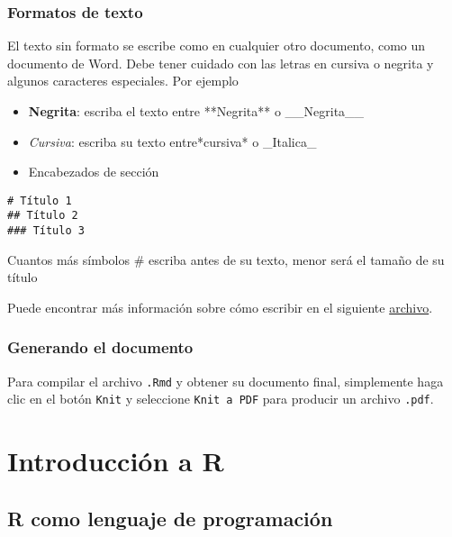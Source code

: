 \documentclass[
]{book}
\providecommand{\tightlist}{%
  \setlength{\itemsep}{0pt}\setlength{\parskip}{0pt}}
\begin{document}
\hypertarget{formatos-de-texto}{%
\subsection{Formatos de texto}\label{formatos-de-texto}}

El texto sin formato se escribe como en cualquier otro documento, como un documento de Word. Debe tener cuidado con las letras en cursiva o negrita y algunos caracteres especiales. Por ejemplo

\begin{itemize}
\tightlist
\item
  \textbf{Negrita}: escriba el texto entre **Negrita** o \_\_Negrita\_\_
\item
  \emph{Cursiva}: escriba su texto entre*cursiva* o \_Italica\_
\item
  Encabezados de sección
\end{itemize}

\begin{verbatim}
# Título 1
## Título 2
### Título 3
\end{verbatim}

Cuantos más símbolos \# escriba antes de su texto, menor será el tamaño de su título

Puede encontrar más información sobre cómo escribir en el siguiente \href{https://rstudio.com/wp-content/uploads/2015/02/rmarkdown-cheatsheet.pdf}{archivo}.

\hypertarget{generando-el-documento}{%
\subsection{Generando el documento}\label{generando-el-documento}}

Para compilar el archivo \texttt{.Rmd} y obtener su documento final, simplemente haga clic en el botón \texttt{Knit} y seleccione \texttt{Knit\ a\ PDF} para producir un archivo \texttt{.pdf}.

\hypertarget{intro}{%
\chapter{Introducción a R}\label{intro}}

\hypertarget{r-como-lenguaje-de-programaciuxf3n}{%
\section{R como lenguaje de programación}\label{r-como-lenguaje-de-programaciuxf3n}}
\end{document}
